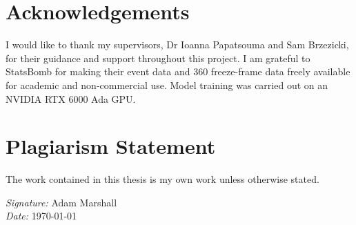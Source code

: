 \documentclass[a4paper,11pt,twoside]{report}
\newcommand{\reportauthor}{Adam Marshall}
\begin{document}
\clearpage
\section*{Acknowledgements}
I would like to thank my supervisors, Dr Ioanna Papatsouma and Sam Brzezicki, for their guidance and support throughout this project. I am grateful to StatsBomb for making their event data and 360 freeze-frame data freely available for academic and non-commercial use. Model training was carried out on an NVIDIA RTX 6000 Ada GPU.
\clearpage

\section*{Plagiarism Statement}
The work contained in this thesis is my own work unless otherwise stated.

\vspace{1em}
\noindent \textit{Signature:} \reportauthor \\
\textit{Date:} \today
\clearpage

\tableofcontents
\clearpage














\appendix





\end{document}

